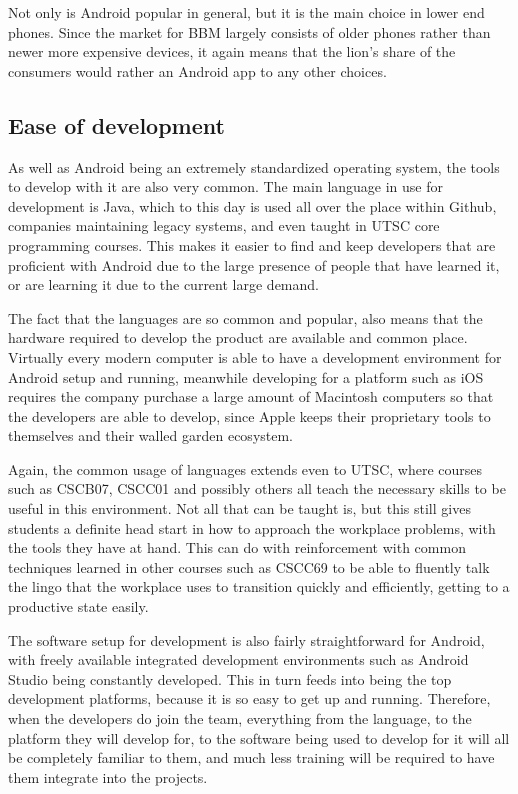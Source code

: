 \documentclass[12pt, letterpaper]{article}
\begin{document}
Not only is Android popular in general, but it is the main choice in
lower end phones. Since the market for BBM largely consists of older
phones rather than newer more expensive devices, it again means that
the lion's share of the consumers would rather an Android app to 
any other choices.

\subsection{Ease of development}
As well as Android being an extremely standardized operating system, the
tools to develop with it are also very common. The main language in use
for development is Java, which to this day is used all over the place
\cite{java} within Github, companies maintaining legacy systems, and even
taught in UTSC core programming courses. This makes it easier to find and
keep developers that are proficient with Android due to the large presence
of people that have learned it, or are learning it due to the current large
demand.

The fact that the languages are so common and popular, also means that the
hardware required to develop the product are available and common place.
Virtually every modern computer is able to have a development environment
for Android setup and running, meanwhile developing for a platform such as
iOS requires the company purchase a large amount of Macintosh computers
so that the developers are able to develop, since Apple keeps their
proprietary tools to themselves and their walled garden ecosystem.

Again, the common usage of languages extends even to UTSC, where courses
such as CSCB07, CSCC01 and possibly others all teach the necessary skills
to be useful in this environment. Not all that can be taught is, but this
still gives students a definite head start in how to approach the workplace
problems, with the tools they have at hand. This can do with reinforcement
with common techniques learned in other courses such as CSCC69 to be able
to fluently talk the lingo that the workplace uses to transition quickly
and efficiently, getting to a productive state easily.

The software setup for development is also fairly straightforward for
Android, with freely available integrated development environments such
as Android Studio being constantly developed. This in turn feeds into being
the top development platforms, because it is so easy to get up and running.
Therefore, when the developers do join the team, everything from the
language, to the platform they will develop for, to the software being used
to develop for it will all be completely familiar to them, and much less
training will be required to have them integrate into the projects.
\end{document}
